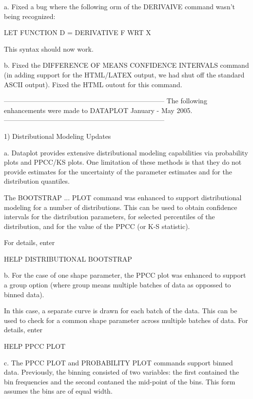{    a. Fixed a bug where the following orm of the DERIVAIVE command
       wasn't being recognized:

           LET FUNCTION D = DERIVATIVE F WRT X

       This syntax should now work.

    b. Fixed the DIFFERENCE OF MEANS CONFIDENCE INTERVALS command
       (in adding support for the HTML/LATEX output, we had shut
       off the standard ASCII output).  Fixed the HTML outout
       for this command.

-----------------------------------------------------------------------
The following enhancements were made to DATAPLOT January - May     2005.
-----------------------------------------------------------------------

 1) Distributional Modeling Updates

    a. Dataplot provides extensive distributional modeling
       capabilities via probability plots and PPCC/KS plots.  One
       limitation of these methods is that they do not provide
       estimates for the uncertainty of the parameter estimates
       and for the distribution quantiles.

       The BOOTSTRAP ... PLOT command was enhanced to support
       distributional modeling for a number of distributions.
       This can be used to obtain confidence intervals for the
       distribution parameters, for selected percentiles of the
       distribution, and for the value of the PPCC (or K-S
       statistic).

       For details, enter

           HELP DISTRIBUTIONAL BOOTSTRAP

    b. For the case of one shape parameter, the PPCC plot was
       enhanced to support a group option (where group means
       multiple batches of data as oppossed to binned data).

       In this case, a separate curve is drawn for each batch
       of the data.  This can be used to check for a common
       shape parameter across multiple batches of data.  For
       details, enter

           HELP PPCC PLOT

    c. The PPCC PLOT and PROBABILITY PLOT commands support binned
       data.  Previously, the binning consisted of two variables:
       the first contained the bin frequencies and the second
       contaned the mid-point of the bins.  This form assumes
       the bins are of equal width.

}

